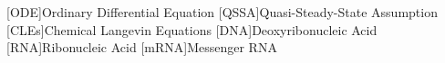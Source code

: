 \begin{acronym}

  [ODE]{Ordinary Differential Equation}
  [QSSA]{Quasi-Steady-State Assumption}
  [CLEs]{Chemical Langevin Equations}
  [DNA]{Deoxyribonucleic Acid}
  [RNA]{Ribonucleic Acid}
  [mRNA]{Messenger RNA}

\end{acronym}
